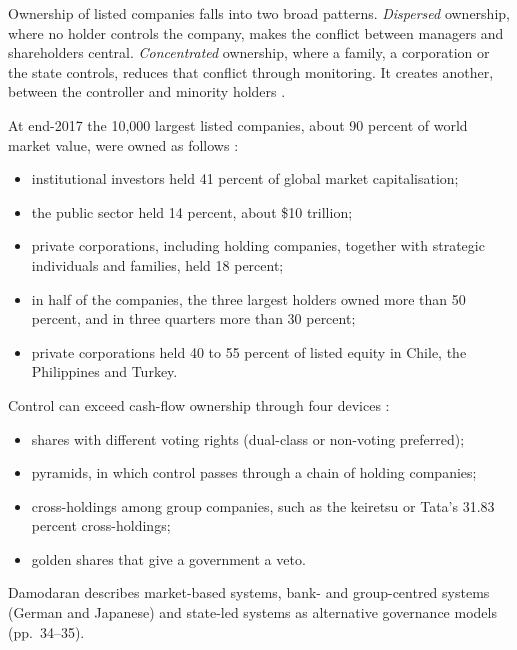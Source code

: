 \begin{qfdefinition}\label{def:global-ownership-structures}
 Ownership of listed companies falls into two broad patterns. \emph{Dispersed} ownership, where no holder controls the company, makes the conflict between managers and shareholders central. \emph{Concentrated} ownership, where a family, a corporation or the state controls, reduces that conflict through monitoring. It creates another, between the controller and minority holders \citep[principle~II.G, p.~20]{oecd-g20-principles-2023}.

At end-2017 the 10,000 largest listed companies, about 90 percent of world market value, were owned as follows \citep[pp.~5--6]{oecd-owners-listed-2019}:
\begin{itemize}
\item institutional investors held 41 percent of global market capitalisation;
\item the public sector held 14 percent, about \$10 trillion;
\item private corporations, including holding companies, together with strategic individuals and families, held 18 percent;
\item in half of the companies, the three largest holders owned more than 50 percent, and in three quarters more than 30 percent;
\item private corporations held 40 to 55 percent of listed equity in Chile, the Philippines and Turkey.
\end{itemize}
Control can exceed cash-flow ownership through four devices \citep[pp.~16--17, 23--24]{applied-corporate-finance-2014}:
\begin{itemize}
\item shares with different voting rights (dual-class or non-voting preferred);
\item pyramids, in which control passes through a chain of holding companies;
\item cross-holdings among group companies, such as the keiretsu or Tata's 31.83 percent cross-holdings;
\item golden shares that give a government a veto.
\end{itemize}
Damodaran describes market-based systems, bank- and group-centred systems (German and Japanese) and state-led systems as alternative governance models (pp.~34--35).


\end{qfdefinition}
